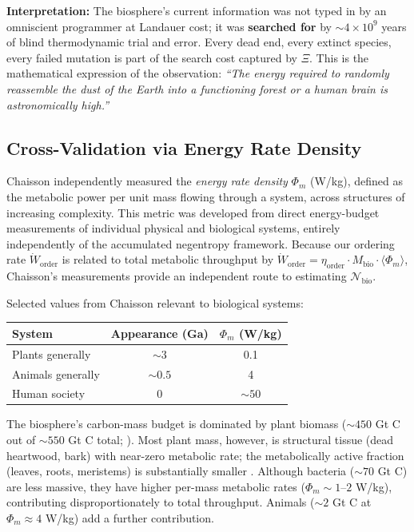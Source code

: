 \documentclass[11pt]{article}
\theoremstyle{plain}
\theoremstyle{definition}
\theoremstyle{remark}
\newcounter{none}
\let\origsubsection\subsection
\renewcommand{\subsection}{\needspace{7\baselineskip}\origsubsection}
\begin{document}
\textbf{Interpretation:} The biosphere's current information was not
typed in by an omniscient programmer at Landauer cost; it was
\textbf{searched for} by \(\sim 4 \times 10^9\) years of blind
thermodynamic trial and error. Every dead end, every extinct species,
every failed mutation is part of the search cost captured by \(\Xi\).
This is the mathematical expression of the observation: \emph{``The
energy required to randomly reassemble the dust of the Earth into a
functioning forest or a human brain is astronomically high.''}

\subsection{Cross-Validation via Energy Rate
Density}\label{cross-validation-via-energy-rate-density}

Chaisson \citetext{\citeyear{Chaisson2001}; \citeyear{Chaisson2011}}
independently measured the \emph{energy rate density} \(\Phi_m\) (W/kg),
defined as the metabolic power per unit mass flowing through a system,
across structures of increasing complexity. This metric was developed
from direct energy-budget measurements of individual physical and
biological systems, entirely independently of the accumulated negentropy
framework. Because our ordering rate \(\dot{W}_{\text{order}}\) is
related to total metabolic throughput by
\(\dot{W}_{\text{order}} = \eta_{\text{order}} \cdot M_{\text{bio}} \cdot \langle \Phi_m \rangle\),
Chaisson's measurements provide an independent route to estimating
\(\mathcal{N}_{\text{bio}}\).

Selected values from Chaisson \citeyearpar[Table 1]{Chaisson2011}
relevant to biological systems:

{\def\LTcaptype{none} %
\begin{longtable}[]{@{}lcc@{}}
\toprule\noalign{}
System & Appearance (Ga) & \(\Phi_m\) (W/kg) \\
\midrule\noalign{}
\endhead
\bottomrule\noalign{}
\endlastfoot
Plants generally & \(\sim 3\) & 0.1 \\
Animals generally & \(\sim 0.5\) & 4 \\
Human society & 0 & \(\sim 50\) \\
\end{longtable}
}

The biosphere's carbon-mass budget is dominated by plant biomass
(\({\sim}450\) Gt C out of \({\sim}550\) Gt C total;
\citeyearpar{BarOn2018}). Most plant mass, however, is structural tissue
(dead heartwood, bark) with near-zero metabolic rate; the metabolically
active fraction (leaves, roots, meristems) is substantially smaller
\citeyearpar{BarOn2018}. Although bacteria (\({\sim}70\) Gt C) are less
massive, they have higher per-mass metabolic rates
(\(\Phi_m \sim 1\)--\(2\) W/kg), contributing disproportionately to
total throughput. Animals (\({\sim}2\) Gt C at \(\Phi_m \approx 4\)
W/kg) add a further contribution.
\end{document}
